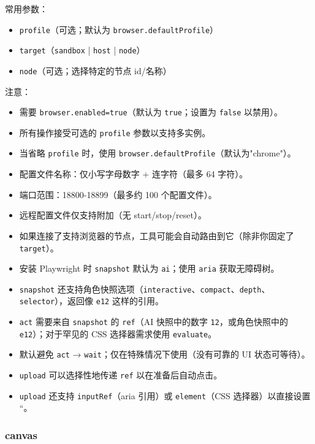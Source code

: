 常用参数：

\begin{itemize}
  \item \texttt{profile}（可选；默认为 \texttt{browser.defaultProfile}）
  \item \texttt{target}（\texttt{sandbox} | \texttt{host} | \texttt{node}）
  \item \texttt{node}（可选；选择特定的节点 id/名称）
\end{itemize}

注意：
\begin{itemize}
  \item 需要 \texttt{browser.enabled=true}（默认为 \texttt{true}；设置为 \texttt{false} 以禁用）。
  \item 所有操作接受可选的 \texttt{profile} 参数以支持多实例。
  \item 当省略 \texttt{profile} 时，使用 \texttt{browser.defaultProfile}（默认为"chrome"）。
  \item 配置文件名称：仅小写字母数字 + 连字符（最多 64 字符）。
  \item 端口范围：18800-18899（最多约 100 个配置文件）。
  \item 远程配置文件仅支持附加（无 start/stop/reset）。
  \item 如果连接了支持浏览器的节点，工具可能会自动路由到它（除非你固定了 \texttt{target}）。
  \item 安装 Playwright 时 \texttt{snapshot} 默认为 \texttt{ai}；使用 \texttt{aria} 获取无障碍树。
  \item \texttt{snapshot} 还支持角色快照选项（\texttt{interactive}、\texttt{compact}、\texttt{depth}、\texttt{selector}），返回像 \texttt{e12} 这样的引用。
  \item \texttt{act} 需要来自 \texttt{snapshot} 的 \texttt{ref}（AI 快照中的数字 \texttt{12}，或角色快照中的 \texttt{e12}）；对于罕见的 CSS 选择器需求使用 \texttt{evaluate}。
  \item 默认避免 \texttt{act} → \texttt{wait}；仅在特殊情况下使用（没有可靠的 UI 状态可等待）。
  \item \texttt{upload} 可以选择性地传递 \texttt{ref} 以在准备后自动点击。
  \item \texttt{upload} 还支持 \texttt{inputRef}（aria 引用）或 \texttt{element}（CSS 选择器）以直接设置 ``。
\end{itemize}


\subsubsection{canvas}


